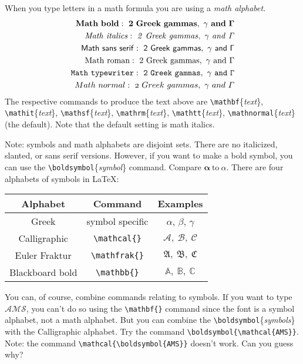 \documentclass{amsart}
\begin{document}
	When you type letters in a math formula you are using a 
	\emph{math alphabet}. 
	\begin{align*}
		\mathbf{Math\ bold:\ 2\ Greek\ gammas,\ \gamma\ and\ \Gamma} \\
		\mathit{Math\ italics:\ 2\ Greek\ gammas,\ \gamma\ and\ \Gamma} \\
		\mathsf{Math\ sans\ serif:\ 2\ Greek\ gammas,\ \gamma\ and\ \Gamma} \\
		\mathrm{Math\ roman:\ 2\ Greek\ gammas,\ \gamma\ and\ \Gamma} \\
		\mathtt{Math\ typewriter:\ 2\ Greek\ gammas,\ \gamma\ and\ \Gamma} \\
		\mathnormal{Math\ normal:\ 2\ Greek\ gammas,\ \gamma\ and\ \Gamma}
	\end{align*}
	The respective commands to produce the text above are 
	\verb+\mathbf+\{\emph{text}\}, 
	\verb+\mathit+\{\emph{text}\}, 
	\verb+\mathsf+\{\emph{text}\}, 
	\verb+\mathrm+\{\emph{text}\}, 
	\verb+\mathtt+\{\emph{text}\}, 
	\verb+\mathnormal+\{\emph{text}\} (the default). 
	Note that the default setting is math italics. 
	
	Note: symbols and math alphabets are disjoint sets. 
	There are no italicized, slanted, or sans serif versions. 
	However, if you want to make a bold symbol, you can use the
	\verb+\boldsymbol+\{\emph{symbol}\} command. 
	Compare $\boldsymbol{\alpha}\ \text{to}\ \alpha$. 
	There are four alphabets of symbols in \LaTeX: 
	\begin{center}
		\begin{tabular}{ccc} %
			Alphabet 	
				& Command 	
				& Examples \\ \hline \hline
			Greek 		
				& symbol specific 	
				& $\alpha$, $\beta$, $\gamma$ \\ \hline
			Calligraphic 
				& \verb+\mathcal{}+ 	
				& $\mathcal{A,\ B,\ C}$ \\ \hline
			Euler Fraktur 	
				& \verb+\mathfrak{}+ 
				& $\mathfrak{A,\ B,\ C}$ \\ \hline
			Blackboard bold 
				& \verb+\mathbb{}+ 	
				& $\mathbb{A,\ B,\ C}$
		\end{tabular}
	\end{center}
	You can, of course, combine commands relating to symbols.
	If you want to type $\boldsymbol{\mathcal{AMS}}$, you can't do so using
	the \verb+\mathbf{}+ command since the font is a symbol alphabet, not a
	math alphabet.
	But you can combine the \verb+\boldsymbol+\{\emph{symbols}\} with
	the Calligraphic alphabet.
	Try the command \verb+\boldsymbol{\mathcal{AMS}}+.
	Note: the command \verb+\mathcal{\boldsymbol{AMS}}+ doesn't work. 
	Can you guess why?
\end{document}
